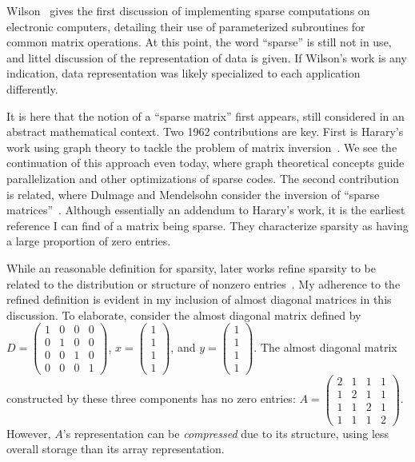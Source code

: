 Wilson~\cite{wilson1959solution} gives the first discussion of implementing sparse computations on electronic computers, detailing their use of parameterized subroutines for common matrix operations. 
At this point, the word \enquote{sparse} is still not in use, and littel discussion of the representation of data is given.
If Wilson's work is any indication, data representation was likely specialized to each application differently. 



It is here that the notion of a \enquote{sparse matrix} first appears, still considered in an abstract mathematical context. 
Two 1962 contributions are key.
First is Harary's work using graph theory to tackle the problem of matrix inversion~\cite{harary1962graph}.
We see the continuation of this approach even today, where graph theoretical concepts guide parallelization and other optimizations of sparse codes.
The second contribution is related, where Dulmage and Mendelsohn consider the inversion of \enquote{sparse matrices}~\cite{dulmage1962inversion}.
Although essentially an addendum to Harary's work, it is the earliest reference I can find of a matrix being sparse.
They characterize sparsity as having a large proportion of zero entries.

While an reasonable definition for sparsity, later works refine sparsity to be related to the distribution or structure of nonzero entries~\cite{duff1977survey}.
My adherence to the refined definition is evident in my inclusion of almost diagonal matrices in this discussion. 
To elaborate, consider the almost diagonal matrix defined by $D=\begin{pmatrix}
  1 & 0 & 0 & 0\\
  0 & 1 & 0 & 0\\
  0 & 0 & 1 & 0 \\
  0 & 0 & 0 & 1
\end{pmatrix}$,
$x=\begin{pmatrix}
  1 \\
  1 \\
  1 \\
  1
\end{pmatrix}$, 
and $y=\begin{pmatrix}
  1 \\
  1 \\
  1 \\
  1
\end{pmatrix}$.
The almost diagonal matrix constructed by these three components has no zero entries: $A=\begin{pmatrix}
  2 & 1 & 1 & 1 \\
  1 & 2 & 1 & 1 \\
  1 & 1 & 2 & 1 \\
  1 & 1 & 1 & 2
\end{pmatrix}$.
However, $A$'s representation can be \textit{compressed} due to its structure, using less overall storage than its array representation.

